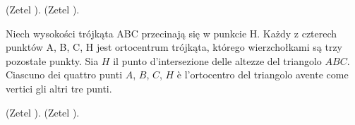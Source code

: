 (Zetel \cite[p.~89]{zetel_2020}). %
(Zetel \cite[p.~89]{zetel_2020}). %

\begin{proposition}
	Niech wysokości trójkąta ABC przecinają się w punkcie H. %
	Każdy z czterech punktów A, B, C, H jest ortocentrum trójkąta, którego wierzchołkami są trzy pozostałe punkty. %
	Sia $H$ il punto d'intersezione delle altezze del triangolo $ABC$. %
	Ciascuno dei quattro punti $A$, $B$, $C$, $H$ è l'ortocentro del triangolo avente come vertici gli altri tre punti. %
\end{proposition}

(Zetel \cite[p.~95]{zetel_2020}). %
(Zetel \cite[p.~95]{zetel_2020}). %

%